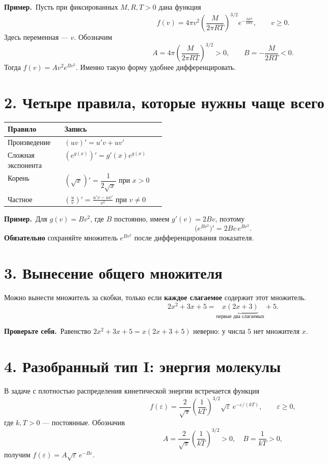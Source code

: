\documentclass[a4paper,12pt]{article}
\newcommand{\note}[1]{\par\noindent\textcolor{redink}{\textbf{Проверьте себя.}}\ #1\par}
\newcommand{\ex}[1]{\par\noindent\textcolor{accentdark}{\textbf{Пример.}}\ #1\par}
\begin{document}
\ex{Пусть при фиксированных $M,R,T>0$ дана функция
\[
 f(v)=4\pi v^2\left(\frac{M}{2\pi RT}\right)^{3/2}
   e^{-\frac{Mv^2}{2RT}},\qquad v\ge0.
\]
Здесь переменная --- $v$. Обозначим
\[
 A=4\pi\left(\frac{M}{2\pi RT}\right)^{3/2}>0,
 \qquad B=-\frac{M}{2RT}<0.
\]
Тогда $f(v)=Av^2e^{Bv^2}$. Именно такую форму удобнее дифференцировать.}

\section*{2. Четыре правила, которые нужны чаще всего}
\begin{tabularx}{\linewidth}{@{}p{0.36\linewidth}X@{}}
\toprule
\textbf{Правило} & \textbf{Запись} \\ \midrule
Произведение & $(uv)'=u'v+uv'$ \\[3pt]
Сложная экспонента & $(e^{g(x)})'=g'(x)e^{g(x)}$ \\[3pt]
Корень & $(\sqrt{x})'=\dfrac{1}{2\sqrt{x}}$ при $x>0$ \\[5pt]
Частное & $\displaystyle\left(\frac{u}{v}\right)'=\frac{u'v-uv'}{v^2}$ при $v\ne0$ \\ 
\bottomrule
\end{tabularx}

\ex{Для $g(v)=Bv^2$, где $B$ постоянно, имеем $g'(v)=2Bv$, поэтому
\[
\boxed{\bigl(e^{Bv^2}\bigr)'=2Bv\,e^{Bv^2}.}
\]
\textbf{Обязательно} сохраняйте множитель $e^{Bv^2}$ после дифференцирования показателя.}

\section*{3. Вынесение общего множителя}
Можно вынести множитель за скобки, только если \textbf{каждое слагаемое} содержит этот множитель.
\[
2x^2+3x+5=\underbrace{x(2x+3)}_{\text{первые два слагаемых}}+5.
\]
\note{Равенство $2x^2+3x+5=x(2x+3+5)$ неверно: у числа $5$ нет множителя $x$.}

\section*{4. Разобранный тип I: энергия молекулы}
В задаче с плотностью распределения кинетической энергии встречается функция
\[
 f(\varepsilon)=\frac{2}{\sqrt\pi}\left(\frac1{kT}\right)^{3/2}
 \sqrt\varepsilon\,e^{-\varepsilon/(kT)},\qquad \varepsilon\ge0,
\]
где $k,T>0$ --- постоянные. Обозначив
\[
 A=\frac2{\sqrt\pi}\left(\frac1{kT}\right)^{3/2}>0,
 \quad B=\frac1{kT}>0,
\]
получим $f(\varepsilon)=A\sqrt\varepsilon\,e^{-B\varepsilon}$.
\end{document}
